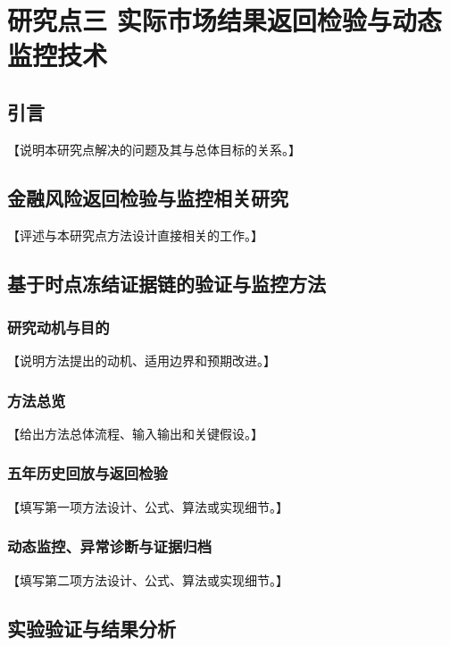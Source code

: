 \chapter{研究点三 实际市场结果返回检验与动态监控技术}

\section{引言}

【说明本研究点解决的问题及其与总体目标的关系。】

\section{金融风险返回检验与监控相关研究}

【评述与本研究点方法设计直接相关的工作。】

\section{基于时点冻结证据链的验证与监控方法}

\subsection{研究动机与目的}

【说明方法提出的动机、适用边界和预期改进。】

\subsection{方法总览}

【给出方法总体流程、输入输出和关键假设。】

\subsection{五年历史回放与返回检验}

【填写第一项方法设计、公式、算法或实现细节。】

\subsection{动态监控、异常诊断与证据归档}

【填写第二项方法设计、公式、算法或实现细节。】

\section{实验验证与结果分析}

